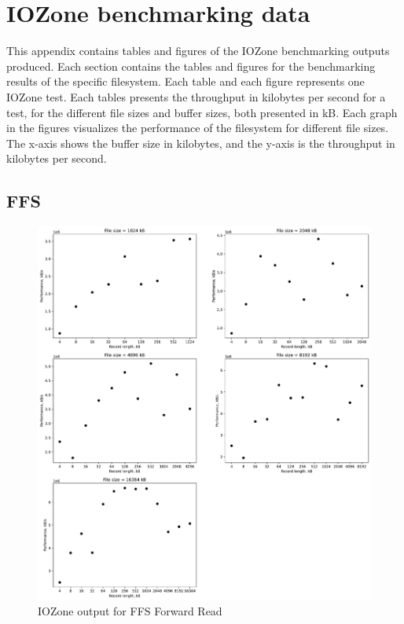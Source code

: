 \chapter{IOZone benchmarking data}
\label{app:bench_data}
This appendix contains tables and figures of the IOZone benchmarking outputs produced. Each section contains the tables and figures for the benchmarking results of the specific filesystem. Each table and each figure represents one IOZone test. Each tables presents the throughput in kilobytes per second for a test, for the different file sizes and buffer sizes, both presented in kB. Each graph in the figures visualizes the performance of the filesystem for different file sizes. The x-axis shows the buffer size in kilobytes, and the y-axis is the throughput in kilobytes per second.

\section{FFS}








\begin{figure}[!htb]
	\label{fig:app_bench_ffs_read}
	\begin{center}
		\includegraphics[width=1.0\textwidth]{figures/benchmarking/ffs/Read.pdf}
	\end{center}
	\caption{IOZone output for FFS Forward Read}
\end{figure}

